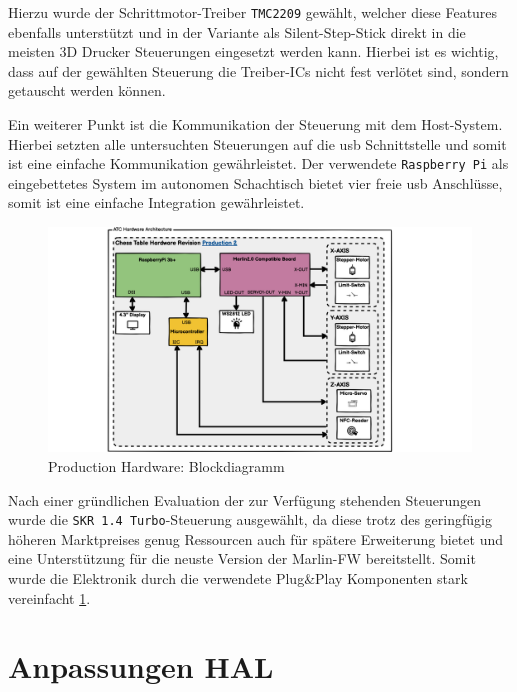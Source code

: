 Hierzu wurde der Schrittmotor-Treiber \passthrough{\lstinline!TMC2209!}
gewählt, welcher diese Features ebenfalls unterstützt und in der
Variante als Silent-Step-Stick direkt in die meisten 3D Drucker
Steuerungen eingesetzt werden kann. Hierbei ist es wichtig, dass auf der
gewählten Steuerung die Treiber-ICs nicht fest verlötet sind, sondern
getauscht werden können.

Ein weiterer Punkt ist die Kommunikation der Steuerung mit dem
Host-System. Hierbei setzten alle untersuchten Steuerungen auf die
\gls{usb} Schnittstelle und somit ist eine einfache Kommunikation
gewährleistet. Der verwendete \passthrough{\lstinline!Raspberry Pi!} als
eingebettetes System im autonomen Schachtisch bietet vier freie
\gls{usb} Anschlüsse, somit ist eine einfache Integration gewährleistet.

\begin{figure}
\centering
\includegraphics{images/ATC_Hardware_Architecture_PROD.png}
\caption{Production Hardware: Blockdiagramm
\label{ATC_Hardware_Architecture_PROD}}
\end{figure}

Nach einer gründlichen Evaluation der zur Verfügung stehenden
Steuerungen wurde die \passthrough{\lstinline!SKR 1.4 Turbo!}-Steuerung
ausgewählt, da diese trotz des geringfügig höheren Marktpreises genug
Ressourcen auch für spätere Erweiterung bietet und eine Unterstützung
für die neuste Version der Marlin-FW\cite{marlinfw} bereitstellt.
Somit wurde die Elektronik durch die verwendete Plug\&Play Komponenten
stark vereinfacht \ref{ATC_Hardware_Architecture_PROD}.

\hypertarget{anpassungen-hal}{%
\section{Anpassungen HAL}\label{anpassungen-hal}}

